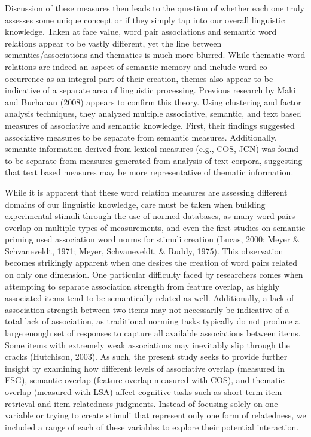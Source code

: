 \documentclass[english,man]{apa6}
\theoremstyle{definition}
\theoremstyle{definition}
\theoremstyle{definition}
\theoremstyle{remark}
\begin{document}
Discussion of these measures then leads to the question of whether each
one truly assesses some unique concept or if they simply tap into our
overall linguistic knowledge. Taken at face value, word pair
associations and semantic word relations appear to be vastly different,
yet the line between semantics/associations and thematics is much more
blurred. While thematic word relations are indeed an aspect of semantic
memory and include word co-occurrence as an integral part of their
creation, themes also appear to be indicative of a separate area of
linguistic processing. Previous research by Maki and Buchanan (2008)
appears to confirm this theory. Using clustering and factor analysis
techniques, they analyzed multiple associative, semantic, and text based
measures of associative and semantic knowledge. First, their findings
suggested associative measures to be separate from semantic measures.
Additionally, semantic information derived from lexical measures (e.g.,
COS, JCN) was found to be separate from measures generated from analysis
of text corpora, suggesting that text based measures may be more
representative of thematic information.

While it is apparent that these word relation measures are assessing
different domains of our linguistic knowledge, care must be taken when
building experimental stimuli through the use of normed databases, as
many word pairs overlap on multiple types of measurements, and even the
first studies on semantic priming used association word norms for
stimuli creation (Lucas, 2000; Meyer \& Schvaneveldt, 1971; Meyer,
Schvaneveldt, \& Ruddy, 1975). This observation becomes strikingly
apparent when one desires the creation of word pairs related on only one
dimension. One particular difficulty faced by researchers comes when
attempting to separate association strength from feature overlap, as
highly associated items tend to be semantically related as well.
Additionally, a lack of association strength between two items may not
necessarily be indicative of a total lack of association, as traditional
norming tasks typically do not produce a large enough set of responses
to capture all available associations between items. Some items with
extremely weak associations may inevitably slip through the cracks
(Hutchison, 2003). As such, the present study seeks to provide further
insight by examining how different levels of associative overlap
(measured in FSG), semantic overlap (feature overlap measured with COS),
and thematic overlap (measured with LSA) affect cognitive tasks such as
short term item retrieval and item relatedness judgments. Instead of
focusing solely on one variable or trying to create stimuli that
represent only one form of relatedness, we included a range of each of
these variables to explore their potential interaction.
\end{document}
